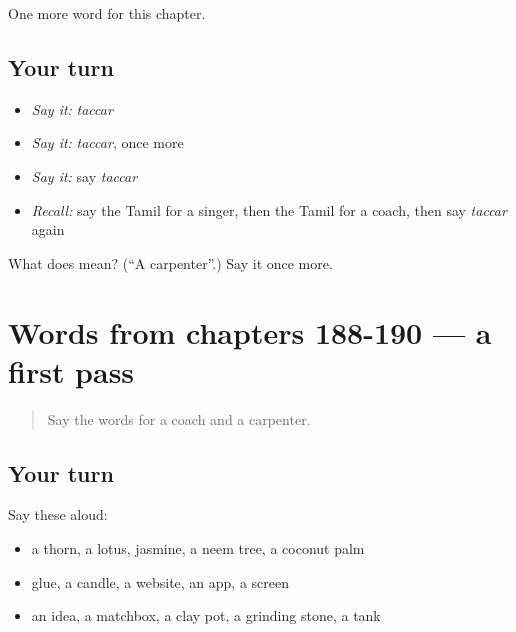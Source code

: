 \begin{grammarlens}[title={What you've built}]
One more word for this chapter.
\end{grammarlens}

\subsection*{Your turn}
\begin{itemize}
\raggedright
  \item \emph{Say it:} \emph{taccar}
  \item \emph{Say it:} \emph{taccar}, once more
  \item \emph{Say it:} say \emph{taccar}
  \item \emph{Recall:} say the Tamil for a singer, then the Tamil for a coach, then say \emph{taccar} again
\end{itemize}

\begin{tcolorbox}[breakable,colback=teal!4,colframe=teal!35!black,title={Before you move on}]
What does  mean? (\textquotedblleft{}A carpenter\textquotedblright{}.) Say it once more.
\end{tcolorbox}
\section[(dialogue)]{Words from chapters 188-190 — a first pass}

\label{lesson:TA-R193-first-pass-words-from-chapters-188-190}



\begin{quote}
Say the words for a coach and a carpenter.
\end{quote}

\subsection*{Your turn}
Say these aloud:

\begin{itemize}
\raggedright
  \item a thorn, a lotus, jasmine, a neem tree, a coconut palm
  \item glue, a candle, a website, an app, a screen
  \item an idea, a matchbox, a clay pot, a grinding stone, a tank
\end{itemize}

